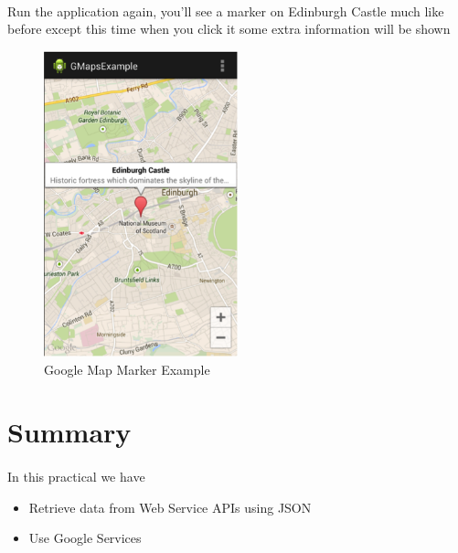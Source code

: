 \paragraph{} Run the application again, you’ll see a marker on Edinburgh Castle much like before except this time when you click it some extra information will be shown

\begin{figure}[H]%
\centering
\includegraphics[width=0.5\textwidth]{images/google-map-info-marker}
\caption{Google Map Marker Example}
\label{fig:google-map-info-marker}
\end{figure}


\section{Summary}
\paragraph{} In this practical we have 

\begin{itemize}
\item Retrieve data from Web Service APIs using JSON
\item Use Google Services
\end{itemize}


